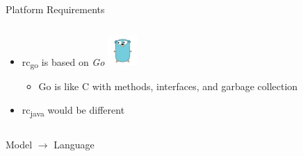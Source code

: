 \documentclass{beamer}
\newcommand{\rcgo}{rc\textsubscript{go}}
\begin{document}
\begin{frame}{Platform Requirements}
  \vspace*{-20pt}

  \begin{columns}
    \begin{column}{.5\textwidth}
      \begin{itemize}
      \item \rcgo{} is based on \emph{Go} \includegraphics[height=32pt]{gopher.png}
        \begin{itemize}
        \item Go is like C with methods, interfaces, and garbage collection
        \end{itemize}
      \item rc\textsubscript{java} would be different
      \end{itemize}
    \end{column}
    \begin{column}{.5\textwidth}
    \end{column}
  \end{columns}


\end{frame}

\begin{frame}{Model $\to$ Language}
  \centering

  \resizebox{\textwidth}{!}{%
    
  }%

\end{frame}
\end{document}
